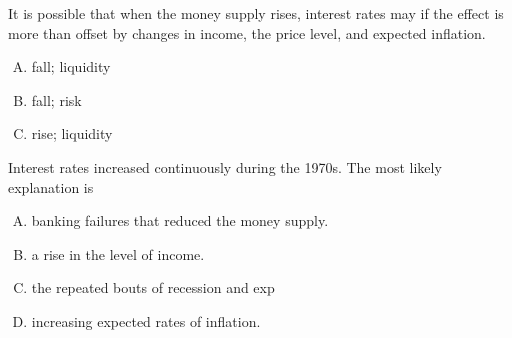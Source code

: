 \documentclass{beamer}
\begin{document}
\begin{practiceframe}[allowframebreaks]
It is possible that when the money supply rises, interest rates may \underline{\hspace{2cm}} if the \underline{\hspace{2cm}} effect is more than offset by changes in income, the price level, and expected inflation.
\begin{enumerate}[A. ]
    \item fall; liquidity
    \item fall; risk
    \item rise; liquidity
\end{enumerate}
\vspace{1em}

Interest rates increased continuously during the 1970s. The most likely explanation is
\begin{enumerate}[A. ]
    \item banking failures that reduced the money supply.
    \item a rise in the level of income.
    \item the repeated bouts of recession and exp
    \item increasing expected rates of inflation.
\end{enumerate}


\end{practiceframe}
\end{document}
